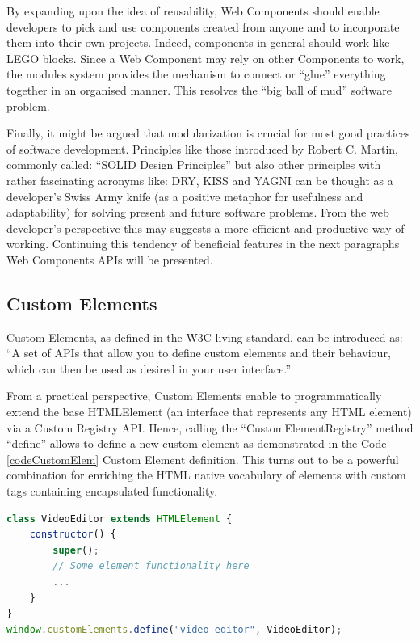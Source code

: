By expanding upon the idea of reusability, Web Components should enable developers to pick and use components created from anyone and to incorporate them into their own projects. Indeed, components in general should work like LEGO blocks. Since a Web Component may rely on other Components to work, the modules system provides the mechanism to connect or “glue” everything together in an organised manner. This resolves the “big ball of mud” software problem.

Finally, it might be argued that modularization is crucial for most good practices of software development. Principles like those introduced by Robert C. Martin, commonly called: “SOLID Design Principles” but also other principles with rather fascinating acronyms like: DRY, KISS and YAGNI can be thought as a developer’s Swiss Army knife (as a positive metaphor for usefulness and adaptability) for solving present and future software problems. From the web developer’s perspective this may suggests a more efficient and productive way of working. Continuing this tendency of beneficial features in the next paragraphs Web Components APIs will be presented.

\subsection{Custom Elements}
\label{subsec:customElements}

Custom Elements, as defined in the W3C living standard, can be introduced as: “A set of APIs that allow you to define custom elements and their behaviour, which can then be used as desired in your user interface.”

From a practical perspective, Custom Elements enable to programmatically extend the base HTMLElement (an interface that represents any HTML element) via a Custom Registry API. Hence, calling the “CustomElementRegistry” method “define” allows to define a new custom element as demonstrated in the Code \ref{codeCustomElem} Custom Element definition. This turns out to be a powerful combination for enriching the HTML native vocabulary of elements with custom tags containing encapsulated functionality.
\\
\begin{lstlisting}[caption={Custom Element definition},label={codeCustomElem}, language=JavaScript]
class VideoEditor extends HTMLElement {
    constructor() {
        super();
        // Some element functionality here
        ...
    }
}
window.customElements.define("video-editor", VideoEditor);
\end{lstlisting}

